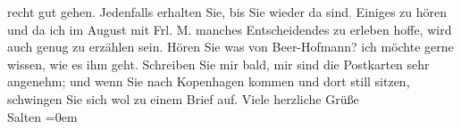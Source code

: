 \begin{ledgroupsized}[t]{13cm}
               recht gut gehen. Jedenfalls erhalten Sie, bis Sie wieder da sind\textcolor{gray}{,}
               Einiges zu hören und da ich im August mit Frl. M. manches Entscheidendes zu erleben hoffe, wird auch genug
               zu erzählen sein. Hören Sie was von Beer-Hofmann? ich möchte gerne wissen, wie es ihm geht. Schreiben {\pb}Sie mir bald, mir sind die
               Postkarten sehr angenehm; und wenn Sie nach Kopenhagen kommen und dort still sitzen, schwingen Sie sich wol zu einem
               Brief auf. \pend
           \pstart
           Viele herzliche Grüße {\\[\baselineskip]}\spacefill\mbox{Salten}\pend
           \leftskip=0em{}
         
         \endnumbering{}\end{ledgroupsized}\begin{anhang}\end{anhang}\newcommand{\dateiname}{L03174}\newcommand{\titel}{Felix Salten an Arthur Schnitzler, 14. 7. [1896]}\newcommand{\editorInnen}{Martin Anton Müller und Laura Untner}
      